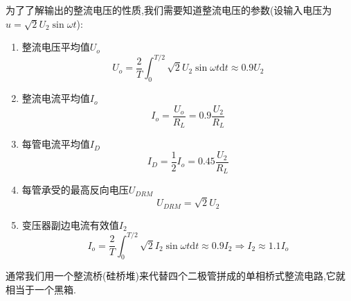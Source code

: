 \Par 为了了解输出的整流电压的性质,我们需要知道整流电压的参数(设输入电压为$u=\sqrt{2}U_2\sin \omega t$):
\begin{enumerate}[(1)]
    \item 整流电压平均值$U_o$
    \begin{equation}
        U_o=\frac{2}{T}\int_0^{T/2}{\sqrt{2}U_2\sin \omega t\mathrm{d}t}\approx 0.9U_2
    \end{equation}
    \item 整流电流平均值$I_o$
    \begin{equation}
        I_o=\frac{U_o}{R_L}=0.9\frac{U_2}{R_L}
    \end{equation}
    \item 每管电流平均值$I_D$
    \begin{equation}
        I_D=\frac{1}{2}I_o=0.45\frac{U_2}{R_L}
    \end{equation}
    \item 每管承受的最高反向电压$U_{DRM}$
    \begin{equation}
        U_{DRM}=\sqrt{2}U_2
    \end{equation}
    \item 变压器副边电流有效值$I_2$
    \begin{equation}
        I_o=\frac{2}{T}\int_0^{T/2}{\sqrt{2}I_2\sin \omega t\mathrm{d}t}\approx 0.9I_2\Longrightarrow I_2\approx 1.1I_o
    \end{equation}
\end{enumerate}

\Par 通常我们用一个整流桥(硅桥堆)来代替四个二极管拼成的单相桥式整流电路,它就相当于一个黑箱.



